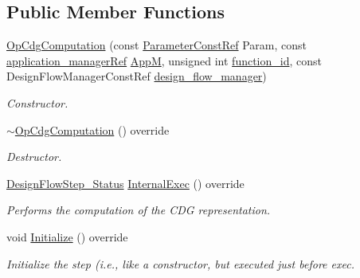 \subsection*{Public Member Functions}
\begin{DoxyCompactItemize}
\item 
\hyperlink{classOpCdgComputation_a722516aa82eef7e012cad2ee897ce59d}{Op\+Cdg\+Computation} (const \hyperlink{Parameter_8hpp_a37841774a6fcb479b597fdf8955eb4ea}{Parameter\+Const\+Ref} Param, const \hyperlink{application__manager_8hpp_a04ccad4e5ee401e8934306672082c180}{application\+\_\+manager\+Ref} \hyperlink{classFrontendFlowStep_a0ac0d8db2a378416583f51c4faa59d15}{AppM}, unsigned int \hyperlink{classFunctionFrontendFlowStep_a58ef2383ad1a212a8d3f396625a4b616}{function\+\_\+id}, const Design\+Flow\+Manager\+Const\+Ref \hyperlink{classDesignFlowStep_ab770677ddf087613add30024e16a5554}{design\+\_\+flow\+\_\+manager})
\begin{DoxyCompactList}\small\item\em Constructor. \end{DoxyCompactList}\item 
\hyperlink{classOpCdgComputation_a045d9c0d3940b48a1a888a8e839d5683}{$\sim$\+Op\+Cdg\+Computation} () override
\begin{DoxyCompactList}\small\item\em Destructor. \end{DoxyCompactList}\item 
\hyperlink{design__flow__step_8hpp_afb1f0d73069c26076b8d31dbc8ebecdf}{Design\+Flow\+Step\+\_\+\+Status} \hyperlink{classOpCdgComputation_ae450186646ed8dea812526b558b5263a}{Internal\+Exec} () override
\begin{DoxyCompactList}\small\item\em Performs the computation of the C\+DG representation. \end{DoxyCompactList}\item 
void \hyperlink{classOpCdgComputation_a38c20d73f1e6af5b403e06affe59a30a}{Initialize} () override
\begin{DoxyCompactList}\small\item\em Initialize the step (i.\+e., like a constructor, but executed just before exec. \end{DoxyCompactList}\end{DoxyCompactItemize}
